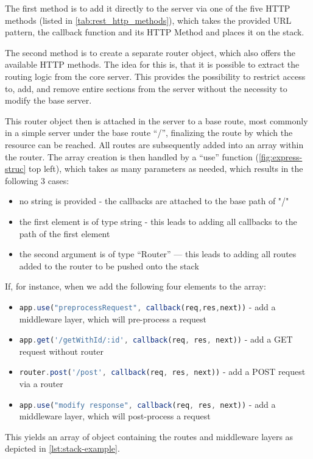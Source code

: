 The first method is to add it directly to the server via one of the five HTTP methods (listed in \autoref{tab:rest_http_methods}), which takes the provided URL pattern, the callback function and its HTTP Method and places it on the stack.

The second method is to create a separate router object, which also offers the available HTTP methods. The idea for this is, that it is possible to extract the routing logic from the core server. This provides the possibility to restrict access to, add, and remove entire sections from the server without the necessity to modify the base server.

This router object then is attached in the server to a base route, most commonly in a simple server under the base route “/”, finalizing the route by which the resource can be reached. All routes are subsequently added into an array within the router. The array creation is then handled by a “use” function (\autoref{fig:express-struc} top left), which takes as many parameters as needed, which results in the following 3 cases:
\begin{itemize}
    \item  no string is provided - the callbacks are attached to the base path of "/"
     \item  the first element is of type string - this leads to adding all callbacks to the path of the first element
    \item  the second argument is of type “Router” — this leads to adding all routes added to the router to be pushed onto the stack
\end{itemize}
If, for instance, when we add the following four elements to the array:    
\begin{itemize}
    \item \lstinline[language=JavaScript]{app.use("preprocessRequest", callback(req,res,next))} - add a middleware layer, which will pre-process a request
    \item \lstinline[language=JavaScript]{app.get('/getWithId/:id', callback(req, res, next))} - add a GET request without router
    \item \lstinline[language=JavaScript]{router.post('/post', callback(req, res, next))} - add a POST request via a router
    \item \lstinline[language=JavaScript]{app.use("modify response", callback(req, res, next))} - add a middleware layer, which will post-process a request
\end{itemize}
This yields an array of object containing the routes and middleware layers as depicted in \autoref{lst:stack-example}.
